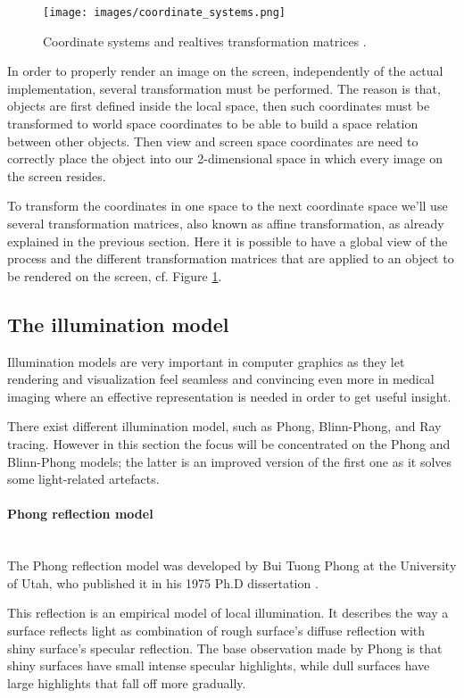 \documentclass[12pt,a4paper]{extarticle}
\newcommand{\myparagraph}[1]{\paragraph{#1}\mbox{}\\}
\begin{document}
\begin{figure}[hbtp]
\centering
\texttt{[image: images/coordinate\_systems.png]}
\caption{Coordinate systems and realtives transformation matrices \cite{learnopengl}.}
\label{fig:coordinate_systems}
\end{figure}

In order to properly render an image on the screen, independently of the actual implementation, several transformation must be performed. The reason is that, objects are first defined inside the local space, then such coordinates must be transformed to world space coordinates to be able to build a space relation between other objects. Then view and screen space coordinates are need to correctly place the object into our 2-dimensional space in which every image on the screen resides.


To transform the coordinates in one space to the next coordinate space we'll use several transformation matrices, also known as affine transformation, as already explained in the previous section.
Here it is possible to have a global view of the process and the different transformation matrices that are applied to an object to be rendered on the screen, cf. Figure \ref{fig:coordinate_systems}.

\pagebreak
\subsection{The illumination model} %
Illumination models are very important in computer graphics as they let rendering and visualization feel seamless and convincing even more in medical imaging where an effective representation is needed in order to get useful insight.
 
There exist different illumination model, such as Phong, Blinn-Phong, and Ray tracing. However in this section the focus will be concentrated on the Phong and Blinn-Phong models; the latter is an improved version of the first one as it solves some light-related artefacts.

\myparagraph{Phong reflection model} The Phong reflection model was developed by Bui Tuong Phong at the University of Utah, who published it in his 1975 Ph.D dissertation \cite{phong_1975}.

This reflection is an empirical model of local illumination. It describes the way a surface reflects light as combination of rough surface's diffuse reflection with shiny surface's specular reflection. The base observation made by Phong is that shiny surfaces have small intense specular highlights, while dull surfaces have large highlights that fall off more gradually. 
\end{document}
